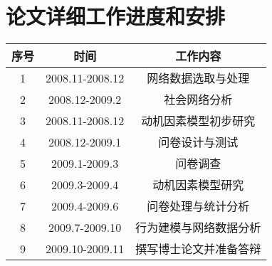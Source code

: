 \documentclass[12pt,a4paper,cs4size]{ctexart}
\begin{document}
\section{论文详细工作进度和安排}
\begin{center}
  \begin{tabular}[center]{|c|c|c|}
 \hline
序号&时间&工作内容\\

\hline
1&2008.11-2008.12&网络数据选取与处理\\
\hline
2&2008.12-2009.2&社会网络分析\\
\hline
3&2008.11-2008.12&动机因素模型初步研究\\
\hline
4&2008.12-2009.1&问卷设计与测试\\
\hline
5&2009.1-2009.3&问卷调查\\
\hline

6&2009.3-2009.4&动机因素模型研究\\
\hline
7&2009.4-2009.6&问卷处理与统计分析\\
\hline
8&2009.7-2009.10&行为建模与网络数据分析\\
\hline
9&2009.10-2009.11&撰写博士论文并准备答辩\\   
\hline
  \end{tabular}
\end{center}







\end{document}
